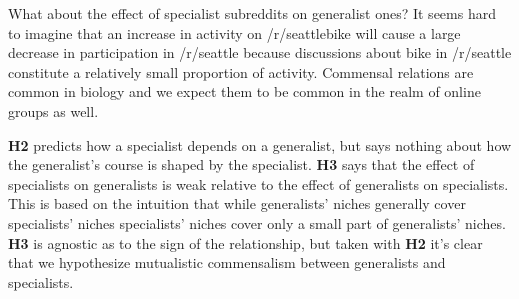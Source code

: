 \documentclass[12pt]{memoir}
\begin{document}
What about the effect of specialist subreddits on generalist ones?  It seems hard to imagine that an increase in activity on /r/seattlebike will cause a large decrease in participation in /r/seattle because discussions about bike in /r/seattle constitute a relatively small proportion of activity.  Commensal relations are common in biology and we expect them to be common in the realm of online groups as well.

\textbf{H2} predicts how a specialist depends on a generalist, but says nothing about how the generalist's course is shaped by the specialist.    \textbf{H3} says that the effect of specialists on generalists is weak relative to the effect of generalists on specialists.  This is based on the intuition that while generalists' niches generally cover specialists' niches specialists' niches cover only a small part of generalists' niches.  \textbf{H3} is agnostic as to the sign of the relationship, but taken with \textbf{H2} it's clear that we hypothesize mutualistic commensalism between generalists and specialists.



\end{document}
